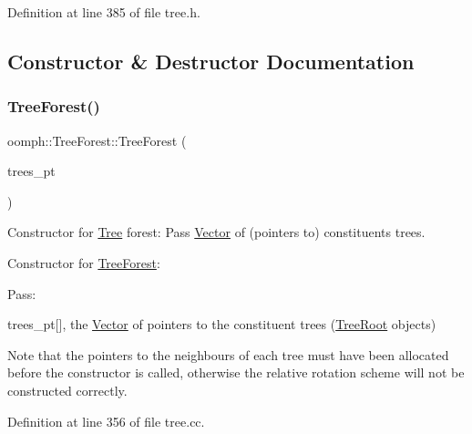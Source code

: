 Definition at line 385 of file tree.\+h.



\subsection{Constructor \& Destructor Documentation}
\mbox{\label{classoomph_1_1TreeForest_a66b579294848fb2bfff13b24dabda1e8}} 
\subsubsection{\texorpdfstring{Tree\+Forest()}{TreeForest()}\hspace{0.1cm}{\footnotesize\ttfamily [1/3]}}
{\footnotesize\ttfamily oomph\+::\+Tree\+Forest\+::\+Tree\+Forest (\begin{DoxyParamCaption}\item[{\hyperlink{classoomph_1_1Vector}{Vector}$<$ \hyperlink{classoomph_1_1TreeRoot}{Tree\+Root} $\ast$$>$ \&}]{trees\+\_\+pt }\end{DoxyParamCaption})}



Constructor for \hyperlink{classoomph_1_1Tree}{Tree} forest\+: Pass \hyperlink{classoomph_1_1Vector}{Vector} of (pointers to) constituents trees. 

Constructor for \hyperlink{classoomph_1_1TreeForest}{Tree\+Forest}\+:

Pass\+:
\begin{DoxyItemize}
\item trees\+\_\+pt\mbox{[}\mbox{]}, the \hyperlink{classoomph_1_1Vector}{Vector} of pointers to the constituent trees (\hyperlink{classoomph_1_1TreeRoot}{Tree\+Root} objects)
\end{DoxyItemize}

Note that the pointers to the neighbour\textquotesingle{}s of each tree must have been allocated before the constructor is called, otherwise the relative rotation scheme will not be constructed correctly. 

Definition at line 356 of file tree.\+cc.

\mbox{\label{classoomph_1_1TreeForest_ac05719b25a53c4f27d94ed8535bf3d6a}} 

